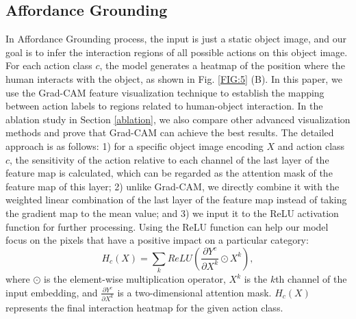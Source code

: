 \documentclass[journal,twoside]{IEEEtran}
\begin{document}
\subsection{Affordance Grounding}
\label{3.4}
\par In Affordance Grounding process, the input is just a static object image, and our goal is to infer the interaction regions of all possible actions on this object image. For each action class $c$, the model generates a heatmap of the position where the human interacts with the object, as shown in Fig. \ref{FIG:5} (B). In this paper, we use the Grad-CAM \cite{selvaraju2017grad} feature visualization technique to establish the mapping between action labels to regions related to human-object interaction. In the ablation study in Section \ref{ablation}, we also compare other advanced visualization methods and prove that Grad-CAM can achieve the best results. The detailed approach is as follows: 1) for a specific object image encoding $X$ and action class $c$, the sensitivity of the action relative to each channel of the last layer of the feature map is calculated, which can be regarded as the attention mask of the feature map of this layer; 2) unlike Grad-CAM, we directly combine it with the weighted linear combination of the last layer of the feature map instead of taking the gradient map to the mean value; and 3) we input it to the ReLU activation function for further processing. Using the ReLU function can help our model focus on the pixels that have a positive impact on a particular category:
\begin{equation}
   H_{c}(X)=\sum_{k}ReLU(\frac{\partial Y^{c}}{\partial X^{k}}\odot X^{k}),  \label{eq:no19}
\end{equation}
where $\odot$ is the element-wise multiplication operator,  $X^{k}$ is the $k$th channel of the input embedding, and $\frac{\partial Y^{c}}{\partial X^{k}}$ is a two-dimensional attention mask. $H_{c}(X)$ represents the final interaction heatmap for the given action class.
\end{document}
